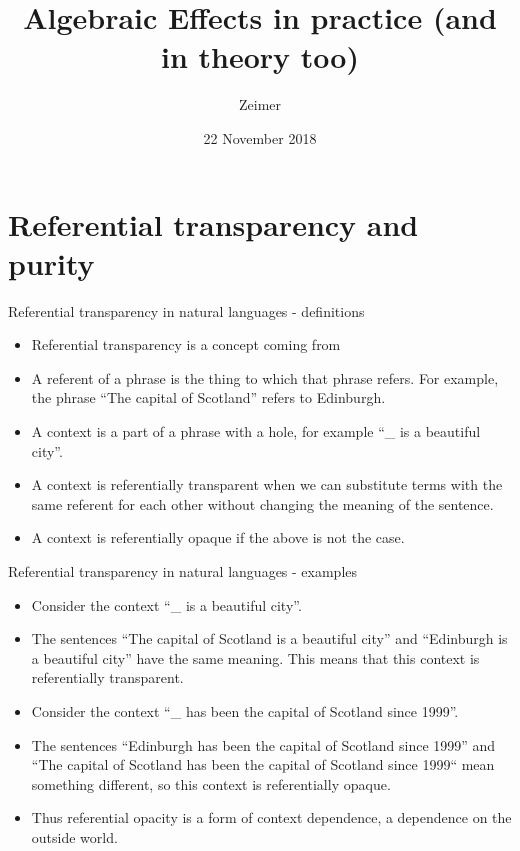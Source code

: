 \documentclass{beamer}
\title{Algebraic Effects in practice (and in theory too)}
\author{Zeimer}
\date{22 November 2018}
\newcommand{\link}[2]{\href{#2}{\color{blue}{#1}}}
\begin{document}
\frame{\titlepage}

\frame{\tableofcontents}

\section{Referential transparency and purity}

\begin{frame}{Referential transparency in natural languages - definitions}
\begin{itemize}
	\item Referential transparency is a concept coming from \link{analytic philosophy}{https://en.wikipedia.org/wiki/Analytic_philosophy}
	\item A referent of a phrase is the thing to which that phrase refers. For example, the phrase ``The capital of Scotland'' refers to Edinburgh.
	\item A context is a part of a phrase with a hole, for example ``\_ is a beautiful city''.
	\item A context is referentially transparent when we can substitute terms with the same referent for each other without changing the meaning of the sentence.
	\item A context is referentially opaque if the above is not the case.
\end{itemize}
\end{frame}

\begin{frame}{Referential transparency in natural languages - examples}
\begin{itemize}
	\item Consider the context ``\_ is a beautiful city''.
	\item The sentences ``The capital of Scotland is a beautiful city'' and ``Edinburgh is a beautiful city'' have the same meaning. This means that this context is referentially transparent.
	\item Consider the context ``\_ has been the capital of Scotland since 1999''.
	\item The sentences ``Edinburgh has been the capital of Scotland since 1999'' and ``The capital of Scotland has been the capital of Scotland since 1999`` mean something different, so this context is referentially opaque.
	\item Thus referential opacity is a form of context dependence, a dependence on the outside world.
\end{itemize}
\end{frame}
\end{document}
